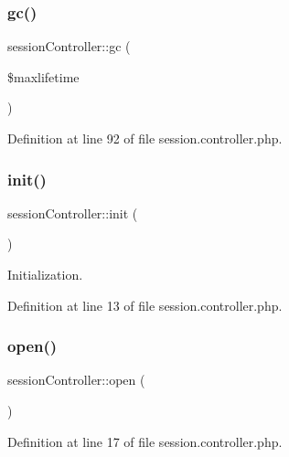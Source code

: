 \mbox{\label{classsessionController_a38ec9eb8d466cbf0191b35f69cd2f960}} 
\subsubsection{\texorpdfstring{gc()}{gc()}}
{\footnotesize\ttfamily session\+Controller\+::gc (\begin{DoxyParamCaption}\item[{}]{\$maxlifetime }\end{DoxyParamCaption})}



Definition at line 92 of file session.\+controller.\+php.

\mbox{\label{classsessionController_a36dc0e81503442a6f77d7d96ab7b5eba}} 
\subsubsection{\texorpdfstring{init()}{init()}}
{\footnotesize\ttfamily session\+Controller\+::init (\begin{DoxyParamCaption}{ }\end{DoxyParamCaption})}



Initialization. 



Definition at line 13 of file session.\+controller.\+php.

\mbox{\label{classsessionController_a6d695e575646db3c90300eb6da7eb69d}} 
\subsubsection{\texorpdfstring{open()}{open()}}
{\footnotesize\ttfamily session\+Controller\+::open (\begin{DoxyParamCaption}{ }\end{DoxyParamCaption})}



Definition at line 17 of file session.\+controller.\+php.

